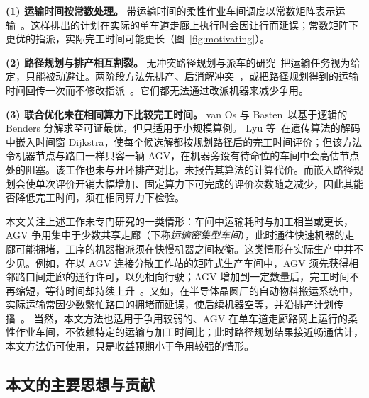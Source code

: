 \documentclass[manuscript,screen,review]{acmart}
\begin{document}
\textbf{(1) 运输时间按常数处理。} 带运输时间的柔性作业车间调度以常数矩阵表示运输~\cite{xin2025review,meng2025cp,qin2026knowledge}。这样排出的计划在实际的单车道走廊上执行时会因让行而延误；常数矩阵下更优的指派，实际完工时间可能更长（图~\ref{fig:motivating}）。

\textbf{(2) 路径规划与排产相互割裂。} 无冲突路径规划与派车的研究~\cite{gao2023mapf,zhang2024guidance,kim2026congestion}把运输任务视为给定，只能被动避让。两阶段方法先排产、后消解冲突~\cite{sun2023integrated}，或把路径规划得到的运输时间回传一次而不修改指派~\cite{li2026framework}。它们都无法通过改派机器来减少争用。

\textbf{(3) 联合优化未在相同算力下比较完工时间。} van Os 与 Basten~\cite{vanos2026exact}以基于逻辑的 Benders 分解求至可证最优，但只适用于小规模算例。
Lyu 等~\cite{lyu2019approach}在遗传算法的解码中嵌入时间窗 Dijkstra，使每个候选解都按规划路径后的完工时间评价；但该方法令机器节点与路口一样只容一辆 AGV，在机器旁设有待命位的车间中会高估节点处的阻塞。该工作也未与开环排产对比，未报告其算法的计算代价。而嵌入路径规划会使单次评价开销大幅增加、固定算力下可完成的评价次数随之减少，因此其能否降低完工时间，须在相同算力下检验。

本文关注上述工作未专门研究的一类情形：车间中运输耗时与加工相当或更长，AGV 争用集中于少数共享走廊（下称\emph{运输密集型车间}），此时通往快速机器的走廊可能拥堵，工序的机器指派须在快慢机器之间权衡。这类情形在实际生产中并不少见。例如，在以 AGV 连接分散工作站的矩阵式生产车间中，AGV 须先获得相邻路口间走廊的通行许可，以免相向行驶；AGV 增加到一定数量后，完工时间不再缩短，等待时间却持续上升~\cite{hardai2025matrix}。又如，在半导体晶圆厂的自动物料搬运系统中，实际运输常因少数繁忙路口的拥堵而延误，使后续机器空等，并沿排产计划传播~\cite{schwenke2018transport}。
当然，本文方法也适用于争用较弱的、AGV 在单车道走廊路网上运行的柔性作业车间，不依赖特定的运输与加工时间比；此时路径规划结果接近畅通估计，本文方法仍可使用，只是收益预期小于争用较强的情形。

\subsection{本文的主要思想与贡献}
\end{document}
